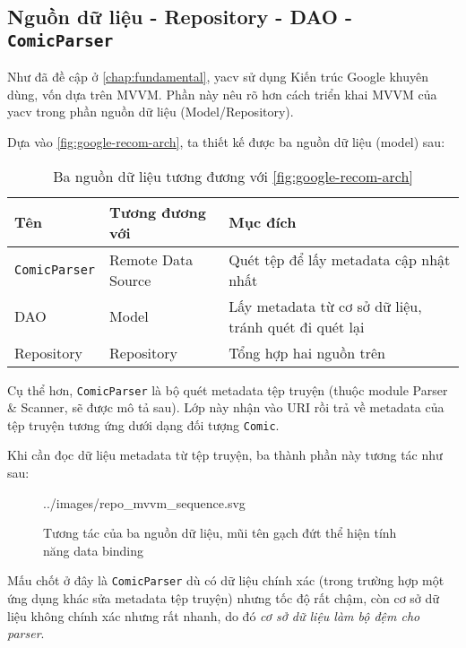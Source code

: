 \documentclass[../../../../thesis]{subfiles}
\begin{document}
\subsection{Nguồn dữ liệu - Repository - DAO - \texttt{ComicParser}}\label{sec:mvvm-design}

Như đã đề cập ở \autoref{chap:fundamental}, yacv sử dụng Kiến trúc Google khuyên
dùng, vốn dựa trên MVVM. Phần này nêu rõ hơn cách triển khai MVVM của yacv trong
phần nguồn dữ liệu (Model/Repository).

Dựa vào \autoref{fig:google-recom-arch}, ta thiết kế được ba nguồn dữ liệu
(model) sau:

\begin{table}[H]
    \centering
    \caption{Ba nguồn dữ liệu tương đương với \autoref{fig:google-recom-arch}}
    \label{tab:3-models}
    \begin{tabular}{l l l}
        \toprule
        Tên                  & Tương đương với    & Mục đích                                              \\
        \midrule
        \texttt{ComicParser} & Remote Data Source & Quét tệp để lấy metadata cập nhật nhất                \\
        DAO                  & Model              & Lấy metadata từ cơ sở dữ liệu, tránh quét đi quét lại \\
        Repository           & Repository         & Tổng hợp hai nguồn trên                               \\
        \bottomrule
    \end{tabular}
\end{table}

Cụ thể hơn, \texttt{ComicParser} là bộ quét metadata tệp truyện (thuộc module
Parser \& Scanner, sẽ được mô tả sau). Lớp này nhận vào URI rồi trả về metadata
của tệp truyện tương ứng dưới dạng đối tượng \texttt{Comic}.

Khi cần đọc dữ liệu metadata từ tệp truyện, ba thành phần này tương tác như sau:

\begin{figure}[H]
    \centering
    
        {../images/repo_mvvm_sequence.svg}
    \caption[Tương tác của ba nguồn dữ liệu]{Tương tác của ba nguồn dữ liệu, mũi
        tên gạch đứt thể hiện tính năng data binding}
    \label{fig:3-models}
\end{figure}

Mấu chốt ở đây là \texttt{ComicParser} dù có dữ liệu chính xác (trong trường hợp
một ứng dụng khác sửa metadata tệp truyện) nhưng tốc độ rất chậm, còn cơ sở dữ
liệu không chính xác nhưng rất nhanh, do đó \emph{cơ sở dữ liệu làm bộ đệm cho
    parser}.
\end{document}
